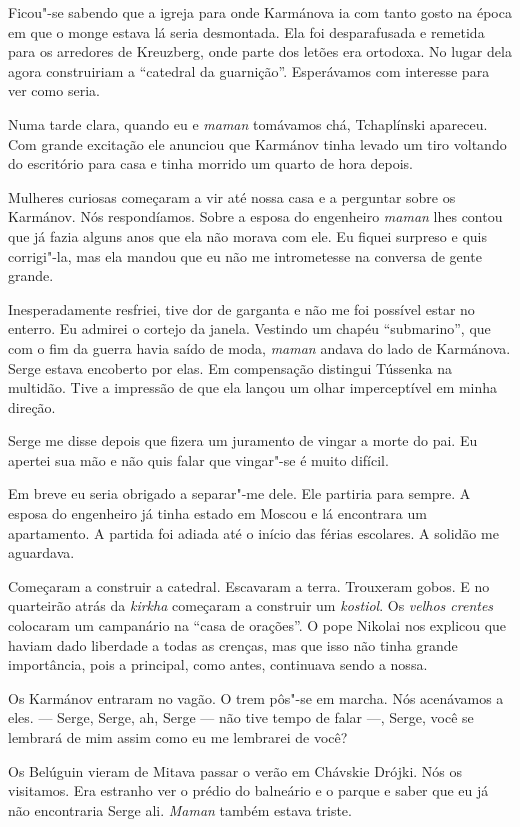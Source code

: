 Ficou"-se sabendo que a igreja para onde Karmánova ia com tanto gosto na
época em que o monge estava lá seria desmontada. Ela foi desparafusada e
remetida para os arredores de Kreuzberg, onde parte dos letões era
ortodoxa. No lugar dela agora construiriam a ``catedral da guarnição''.
Esperávamos com interesse para ver como seria.

Numa tarde clara, quando eu e \emph{maman} tomávamos chá, Tchaplínski
apareceu. Com grande excitação ele anunciou que Karmánov tinha levado um
tiro voltando do escritório para casa e tinha morrido um quarto de hora
depois.

Mulheres curiosas começaram a vir até nossa casa e a perguntar sobre os
Karmánov. Nós respondíamos. Sobre a esposa do engenheiro \emph{maman}
lhes contou que já fazia alguns anos que ela não morava com ele. Eu
fiquei surpreso e quis corrigi"-la, mas ela mandou que eu não me
intrometesse na conversa de gente grande.

Inesperadamente resfriei, tive dor de garganta e não me foi possível
estar no enterro. Eu admirei o cortejo da janela. Vestindo um chapéu
``submarino'', que com o fim da guerra havia saído de moda, \emph{maman}
andava do lado de Karmánova. Serge estava encoberto por elas. Em
compensação distingui Tússenka na multidão. Tive a impressão de que ela
lançou um olhar imperceptível em minha direção.

Serge me disse depois que fizera um juramento de vingar a morte do pai.
Eu apertei sua mão e não quis falar que vingar"-se é muito difícil.

Em breve eu seria obrigado a separar"-me dele. Ele partiria para sempre.
A esposa do engenheiro já tinha estado em Moscou e lá encontrara um
apartamento. A partida foi adiada até o início das férias escolares. A
solidão me aguardava.

Começaram a construir a catedral. Escavaram a terra. Trouxeram gobos. E
no quarteirão atrás da \emph{kirkha} começaram a construir um
\emph{kostiol}. Os \emph{velhos crentes} colocaram um campanário na
``casa de orações''. O pope Nikolai nos explicou que haviam dado
liberdade a todas as crenças, mas que isso não tinha grande importância,
pois a principal, como antes, continuava sendo a nossa.

Os Karmánov entraram no vagão. O trem pôs"-se em marcha. Nós acenávamos a
eles. --- Serge, Serge, ah, Serge --- não tive tempo de falar ---,
Serge, você se lembrará de mim assim como eu me lembrarei de você?

Os Belúguin vieram de Mitava passar o verão em Chávskie Drójki. Nós os
visitamos. Era estranho ver o prédio do balneário e o parque e saber que
eu já não encontraria Serge ali. \emph{Maman} também estava triste.

